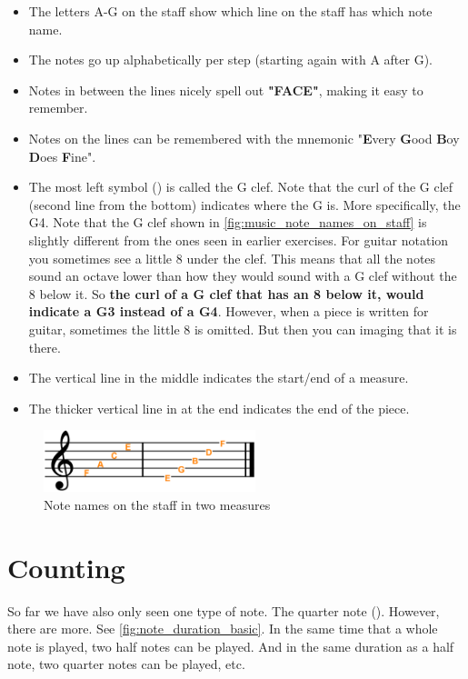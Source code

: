 \begin{itemize}
	\item The letters A-G on the staff show which line on the staff has which note name.
	\item The notes go up alphabetically per step (starting again with A after G). 
	\item Notes in between the lines nicely spell out \textbf{"FACE"}, making it easy to remember.
	\item Notes on the lines can be remembered with the mnemonic "\textbf{E}very \textbf{G}ood \textbf{B}oy \textbf{D}oes \textbf{F}ine".
	\item The most left symbol (\clefG) is called the G clef. Note that the curl of the G clef (second line from the bottom) indicates where the G is. More specifically, the G4.
	\subitem Note that the G clef shown in \autoref{fig:music_note_names_on_staff} is slightly different from the ones seen in earlier exercises. For guitar notation you sometimes see a little 8 under the clef. This means that all the notes sound an octave lower than how they would sound with a G clef without the 8 below it. So \textbf{the curl of a G clef that has an 8 below it, would indicate a G3 instead of a G4}. However, when a piece is written for guitar, sometimes the little 8 is omitted. But then you can imaging that it is there.
	\item The vertical line in the middle indicates the start/end of a measure.
	\item The thicker vertical line in at the end indicates the end of the piece.
\end{itemize}

\begin{figure}[h]
	\centering
	\includegraphics[width=0.55\textwidth]{../../Images/MusicNotation_MeasureNoteNames.png}
	\caption{Note names on the staff in two measures}
	\label{fig:music_note_names_on_staff}
\end{figure}

\newpage

\section{Counting}

So far we have also only seen one type of note. The quarter note (\quarterNote). However, there are more. See \autoref{fig:note_duration_basic}. In the same time that a whole note is played, two half notes can be played. And in the same duration as a half note, two quarter notes can be played, etc.

